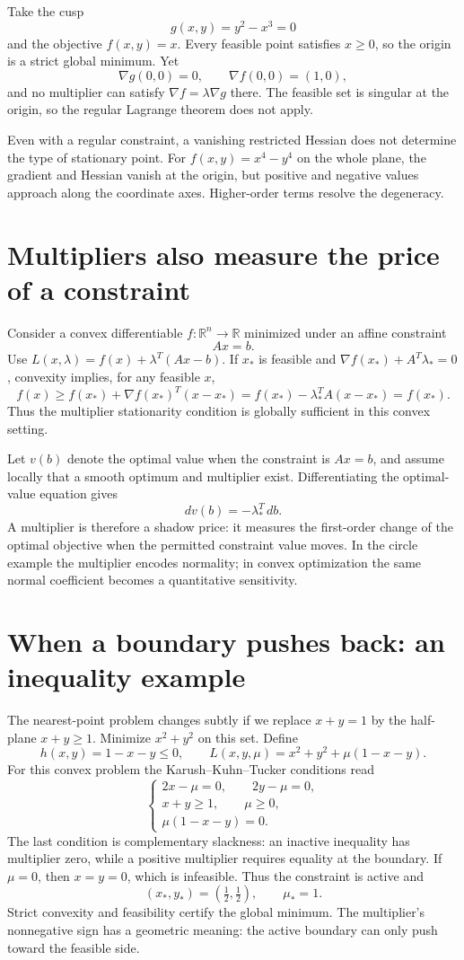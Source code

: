 Take the cusp
\[
 g(x,y)=y^2-x^3=0
\]
and the objective \(f(x,y)=x\). Every feasible point satisfies \(x\ge0\), so the origin is a strict global minimum. Yet
\[
 \nabla g(0,0)=0,\qquad \nabla f(0,0)=(1,0),
\]
and no multiplier can satisfy \(\nabla f=\lambda\nabla g\) there. The feasible set is singular at the origin, so the regular Lagrange theorem does not apply.

Even with a regular constraint, a vanishing restricted Hessian does not determine the type of stationary point. For \(f(x,y)=x^4-y^4\) on the whole plane, the gradient and Hessian vanish at the origin, but positive and negative values approach along the coordinate axes. Higher-order terms resolve the degeneracy.

\section{Multipliers also measure the price of a constraint}

Consider a convex differentiable \(f:\mathbb R^n\to\mathbb R\) minimized under an affine constraint
\[
 Ax=b.
\]
Use \(L(x,\lambda)=f(x)+\lambda^T(Ax-b)\). If \(x_*\) is feasible and \(\nabla f(x_*)+A^T\lambda_*=0\), convexity implies, for any feasible \(x\),
\[
 f(x)\ge f(x_*)+\nabla f(x_*)^T(x-x_*)
       =f(x_*)-\lambda_*^TA(x-x_*)=f(x_*).
\]
Thus the multiplier stationarity condition is globally sufficient in this convex setting.

Let \(v(b)\) denote the optimal value when the constraint is \(Ax=b\), and assume locally that a smooth optimum and multiplier exist. Differentiating the optimal-value equation gives
\[
 dv(b)=-\lambda_*^T\,db.
\]
A multiplier is therefore a shadow price: it measures the first-order change of the optimal objective when the permitted constraint value moves. In the circle example the multiplier encodes normality; in convex optimization the same normal coefficient becomes a quantitative sensitivity.

\section{When a boundary pushes back: an inequality example}

The nearest-point problem changes subtly if we replace $x+y=1$ by the half-plane $x+y\ge1$. Minimize $x^2+y^2$ on this set. Define
\[
 h(x,y)=1-x-y\le0,\qquad
 L(x,y,\mu)=x^2+y^2+\mu(1-x-y).
\]
For this convex problem the Karush--Kuhn--Tucker conditions read
\[
 \begin{cases}
 2x-\mu=0,\qquad 2y-\mu=0,\\
 x+y\ge1,\qquad\mu\ge0,\\
 \mu(1-x-y)=0.
 \end{cases}
\]
The last condition is complementary slackness: an inactive inequality has multiplier zero, while a positive multiplier requires equality at the boundary. If $\mu=0$, then $x=y=0$, which is infeasible. Thus the constraint is active and
\[
 \boxed{(x_*,y_*)=(\tfrac12,\tfrac12),\qquad\mu_*=1.}
\]
Strict convexity and feasibility certify the global minimum. The multiplier's nonnegative sign has a geometric meaning: the active boundary can only push toward the feasible side.

